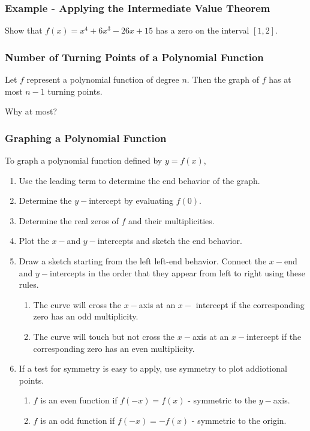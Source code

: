 \documentclass{beamer}
\begin{document}
\begin{frame}
    \frametitle{Example - Applying the Intermediate Value Theorem}

    Show that \(f(x)= x^4 + 6x^3 - 26 x + 15\) has a zero on the interval \([1,2]\). 

\end{frame}

\begin{frame}
    \frametitle{Number of Turning Points of a Polynomial Function}

    Let \(f\) represent a polynomial function of degree \(n\). Then the graph of \(f\) has at most \(n-1\) turning points. \\\pause 

    \vspace{1cm}

    Why at most? 

    

\end{frame}

\begin{frame}
    \frametitle{Graphing a Polynomial Function}

    To graph a polynomial function defined by \(y = f(x)\),
    \begin{enumerate}
        \item Use the leading term to determine the end behavior of the graph. \pause
        \item Determine the \(y-\)intercept by evaluating \(f(0)\). \pause
        \item Determine the real zeros of \(f\) and their multiplicities. \pause
        \item Plot the \(x-\)and \(y-\)intercepts and sketch the end behavior. \pause 
        \item Draw a sketch starting from the left left-end behavior. Connect the \(x-\)end and \(y-\)intercepts in the order that they appear from left to right using these rules. 
        \begin{enumerate}
            \item The curve will cross the \(x-\)axis at an \(x-\) intercept if the corresponding zero has an odd multiplicity. 
            \item The curve will touch but not cross the \(x-\)axis at an \(x-\)intercept if the corresponding zero has an even multiplicity. 
        \end{enumerate}\pause
        \item If a test for symmetry is easy to apply, use symmetry to plot addiotional points. 
        \begin{enumerate}
            \item \(f\) is an even function if \(f(-x )=f(x)\) - symmetric to the \(y-\)axis.
            \item \(f\) is an odd function if \(f(-x)=-f(x)\) - symmetric to the origin.  
        \end{enumerate}
    \end{enumerate}

\end{frame}
\end{document}
